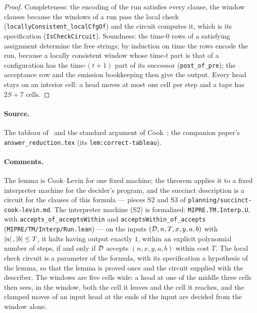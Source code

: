 \begin{proof}
\leanok
Completeness: the encoding of the run satisfies every clause, the window clauses because
the windows of a run pass the local check (\texttt{locallyConsistent\_localCfgOf}) and the
circuit computes it, which is its specification (\texttt{IsCheckCircuit}). Soundness: the
time-$0$ rows of a satisfying assignment determine the free strings; by induction on time
the rows encode the run, because a locally consistent window whose time-$t$ part is that
of a configuration has the time-$(t + 1)$ part of its successor (\texttt{post\_of\_pre});
the acceptance row and the emission bookkeeping then give the output. Every head stays on
an interior cell: a head moves at most one cell per step and a tape has $2S + 7$ cells.
\end{proof}

\paragraph{Source.} The tableau of~\cite[Section 10]{JNVWY20} and the standard argument of
Cook~\cite{Coo71}; the companion paper's \texttt{answer\_reduction.tex} (its
\texttt{lem:correct-tableau}).

\paragraph{Comments.} The lemma is Cook--Levin for one fixed machine; the theorem applies
it to a fixed interpreter machine for the decider's program, and the succinct description
is a circuit for the clauses of this formula --- pieces S2 and S3 of
\texttt{planning/succinct-cook-levin.md}. The interpreter machine (S2) is formalized:
\texttt{MIPRE.TM.Interp.U}, with \texttt{accepts\_of\_acceptsWithin} and
\texttt{acceptsWithin\_of\_accepts} (\texttt{MIPRE/TM/Interp/Run.lean}) --- on the inputs
$(\mathcal{D}, n, T, x, y, a, b)$ with $\left\vert {a} \right\vert, \left\vert {b} \right\vert \leq T$, it halts having output
exactly $1$, within an explicit polynomial number of steps, if and only if $\mathcal{D}$
accepts $(n, x, y, a, b)$ within cost $T$. The local check circuit is a parameter of the
formula, with its specification a hypothesis of the lemma, so that the lemma is proved once
and the circuit supplied with the describer. The windows are five cells wide: a head at one
of the middle three cells then sees, in the window, both the cell it leaves and the cell it
reaches, and the clamped moves of an input head at the ends of the input are decided from
the window alone.


